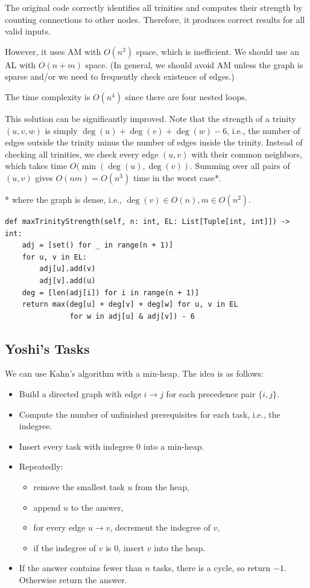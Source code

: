 \documentclass[12pt]{article}
\begin{document}
The original code correctly identifies all trinities and computes their strength by counting connections to other nodes. Therefore, it produces correct results for all valid inputs.

However, it uses AM with $O\left(n^2\right)$ space, which is inefficient. We should use an AL with $O(n+m)$ space. (In general, we should avoid AM unless the graph is sparse and/or we need to frequently check existence of edges.)

The time complexity is $O\left(n^4\right)$ since there are four nested loops.

This solution can be significantly improved. Note that the strength of a trinity $(u,v,w)$ is simply $\deg(u)+\deg(v)+\deg(w)-6$, i.e., the number of edges outside the trinity minus the number of edges inside the trinity. Instead of checking all trinities, we check every edge $(u, v)$ with their common neighbors, which takes time $O(\min(\deg(u),\deg(v))$. Summing over all pairs of $(u, v)$ gives $O(nm)=O\left(n^3\right)$ time in the worst case*.

* where the graph is dense, i.e., $\deg(v)\in O(n), m\in O\left(n^2\right)$.
\begin{verbatim}
def maxTrinityStrength(self, n: int, EL: List[Tuple[int, int]]) -> int:
    adj = [set() for _ in range(n + 1)]
    for u, v in EL:
        adj[u].add(v)
        adj[v].add(u)
    deg = [len(adj[i]) for i in range(n + 1)]
    return max(deg[u] + deg[v] + deg[w] for u, v in EL
               for w in adj[u] & adj[v]) - 6
\end{verbatim}
\newpage
\subsection{Yoshi's Tasks}
We can use Kahn's algorithm with a min-heap. The idea is as follows:
\begin{itemize}
\item Build a directed graph with edge $i\to j$ for each precedence pair $\{i, j\}$.
\item Compute the number of unfinished prerequisites for each task, i.e., the indegree.
\item Insert every task with indegree $0$ into a min-heap.
\item Repeatedly:
\begin{itemize}
\item remove the smallest task $u$ from the heap,
\item append $u$ to the answer,
\item for every edge $u\to v$, decrement the indegree of $v$,
\item if the indegree of $v$ is $0$, insert $v$ into the heap.
\end{itemize}
\item If the answer contains fewer than $n$ tasks, there is a cycle, so return $-1$. Otherwise return the answer.
\end{itemize}
\end{document}
